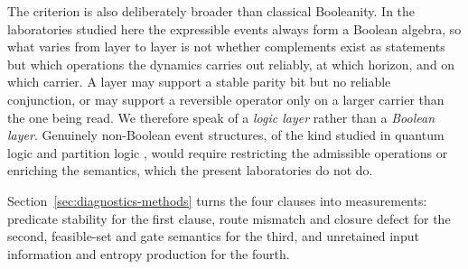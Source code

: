 The criterion is also deliberately broader than classical Booleanity. In the laboratories studied here the expressible events always form a Boolean algebra, so what varies from layer to layer is not whether complements exist as statements but which operations the dynamics carries out reliably, at which horizon, and on which carrier. A layer may support a stable parity bit but no reliable conjunction, or may support a reversible operator only on a larger carrier than the one being read. We therefore speak of a \emph{logic layer} rather than a \emph{Boolean layer}. Genuinely non-Boolean event structures, of the kind studied in quantum logic and partition logic \cite{birkhoff1936quantumlogic,ellerman2010partitions,atmanspacher2015nonboolean}, would require restricting the admissible operations or enriching the semantics, which the present laboratories do not do.

Section~\ref{sec:diagnostics-methods} turns the four clauses into measurements: predicate stability for the first clause, route mismatch and closure defect for the second, feasible-set and gate semantics for the third, and unretained input information and entropy production for the fourth.
